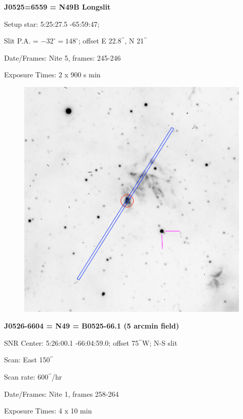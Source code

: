 \documentclass[11pt]{article}
\newcommand{\arcsec}{$^{\prime\prime}$}
\begin{document}
\newpage
{\bf J0525=6559 = N49B Longslit}  
 
Setup star:   5:25:27.5  -65:59:47;

Slit P.A. = $-32^\circ = 148^\circ$;     offset E 22.8\arcsec,  N 21\arcsec   

Date/Frames:  Nite 5, frames: 245-246   

Exposure Times:  2 x 900 s min

\begin{figure}
\includegraphics[width=12.5cm]{snapshots/N49B_longslit.png}
\end{figure}


\newpage
{\bf J0526-6604 = N49 = B0525-66.1 (5 arcmin field)}  
 
SNR Center:   5:26:00.1   -66:04:59.0;  offset 75\arcsec W;      N-S slit

Scan:  East   150\arcsec

Scan rate:    600\arcsec/hr

Date/Frames:  Nite 1, frames 258-264

Exposure Times:  4 x 10 min
\end{document}
